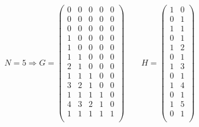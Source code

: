 \documentclass{article}
\begin{document}
\thispagestyle{empty}

$$
N=5 \Rightarrow G=
\begin{pmatrix}
 0&  0&  0&  0&  0\\
 0&  0&  0&  0&  0\\
 0&  0&  0&  0&  0\\
 1&  0&  0&  0&  0\\
 1&  0&  0&  0&  0\\
 1&  1&  0&  0&  0\\
 2&  1&  0&  0&  0\\
 1&  1&  1&  0&  0\\
 3&  2&  1&  0&  0\\
 1&  1&  1&  1&  0\\
 4&  3&  2&  1&  0\\
 1&  1&  1&  1&  1\\
\end{pmatrix}
\qquad H=
\begin{pmatrix}
1&  0\\
0&  1\\
1&  1\\
0&  1\\
1&  2\\
0&  1\\
1&  3\\
0&  1\\
1&  4\\
0&  1\\
1&  5\\
0&  1\\
\end{pmatrix}
$$
\end{document}
